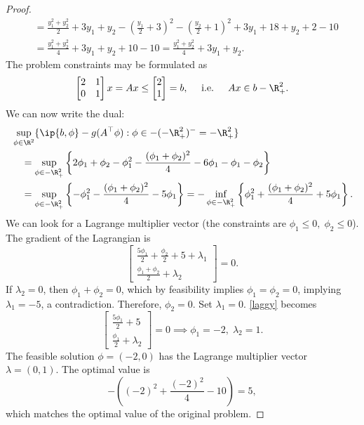 \documentclass[../borwein-lewis_notes.tex]{subfiles}
\begin{document}
{\begin{proof}
\begin{align*}
&= \frac{y_1^2+y_2^2}{2} + 3y_1 + y_2 - (\frac{y_1}{2}+3)^2
-(\frac{y_2}{2}+1)^2 + 3y_1+18 +y_2 + 2 - 10  \\
&= \frac{y_1^2 + y_2^2}{4} + 3y_1 + y_2 + 10 - 10 
= \frac{y_1^2 + y_2^2}{4} + 3y_1 + y_2.
\end{align*}
The problem constraints may be formulated as 
\begin{equation*}
\begin{bmatrix} 2 & 1 \\ 0 & 1 \end{bmatrix} x = Ax \leq 
\begin{bmatrix}2 \\ 1\end{bmatrix}=b, \quad \text{ i.e. }\quad
Ax \in b - \R_+^2.
\end{equation*}
We can now write the dual: 
\begin{align*}
&\sup_{\phi\in\R^2}\{\ip{b,\phi} - g(A^\top \phi) : \phi\in-(-\R_+^2)^-
= - \R_+^2 \}\\
&\quad = \sup_{\phi\in-\R_+^2}\left\{2\phi_1+\phi_2 - \phi_1^2 
- \frac{(\phi_1+\phi_2)^2}{4} - 6\phi_1 - \phi_1 - \phi_2 \right\} \\
&\quad = \sup_{\phi\in- \R_+^2}\left\{-\phi_1^2 - \frac{(\phi_1+\phi_2)^2
}{4} - 5\phi_1 \right\} = -\inf_{\phi\in-\R_+^2}\left\{\phi_1^2 
+ \frac{(\phi_1+\phi_2)^2}{4} + 5\phi_1\right\}.
\end{align*}
We can look for a Lagrange multiplier vector (the constraints are 
$\phi_1\leq 0,\;\phi_2\leq 0$). The gradient of the Lagrangian is 
\begin{equation}
\label{laggy}
\begin{bmatrix} \frac{5\phi_1}{2} + \frac{\phi_2}{2} + 5 +\lambda_1 \\
\frac{\phi_1+\phi_2}{2} +\lambda_2 \end{bmatrix} = 0.
\end{equation}
If $\lambda_2=0$, then $\phi_1+\phi_2=0$, which by feasibility 
implies $\phi_1=\phi_2=0$, implying $\lambda_1 =-5$, a contradiction.
Therefore, $\phi_2=0$. Set $\lambda_1=0$. \eqref{laggy} becomes 
\begin{equation*}
\begin{bmatrix} \frac{5\phi_1}{2} + 5 \\ \frac{\phi_1}{2} + \lambda_2
\end{bmatrix} = 0 \implies \phi_1=-2,\; \lambda_2 = 1.
\end{equation*}
The feasible solution $\phi=(-2,0)$ has the Lagrange multiplier
vector $\lambda = (0, 1)$. The optimal value is 
\begin{equation*}
-\left((-2)^2 + \frac{(-2)^2}{4} - 10\right) = 5,
\end{equation*}
which matches the optimal value of the original problem.
\end{proof}}
\end{document}
